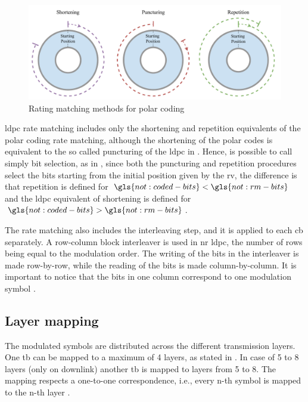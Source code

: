 \begin{figure}[htb]
    \includegraphics[width=\columnwidth]{figures/chp_theory/rate-matching.pdf}
    \caption{Rating matching methods for polar coding}
    \label{fig:rate-matching}
\end{figure}

\Gls{ldpc} rate matching includes only the shortening and repetition equivalents of the polar coding rate matching, although the shortening of the polar codes is equivalent to the so called puncturing of the \gls{ldpc} in \cite{Hui2018}.
%
Hence, is possible to call simply bit selection, as in \cite{3gpp.38.212}, since both the puncturing and repetition procedures select the bits starting from the initial position given by the \gls{rv}, the difference is that repetition is defined for $\gls{not:coded-bits} < \gls{not:rm-bits}$ and the \gls{ldpc} equivalent of shortening is defined for $\gls{not:coded-bits} > \gls{not:rm-bits}$.

The rate matching also includes the interleaving step, and it is applied to each \gls{cb} separately.
%
A row-column block interleaver is used in \gls{nr} \gls{ldpc}, the number of rows being equal to the modulation order.
%
The writing of the bits in the interleaver is made row-by-row, while the reading of the bits is made column-by-column.
%
It is important to notice that the bits in one column correspond to one modulation symbol \cite{Hamidi8417496,ErikDahlman5G}.

\subsection{Layer mapping}

The modulated symbols are distributed across the different transmission layers.
%
One \gls{tb} can be mapped to a maximum of 4 layers, as stated in  \cite[Table 7.3.1.3]{3gpp.38.211}.
%
In case of 5 to 8 layers (only on downlink) another \gls{tb} is mapped to layers from 5 to 8.
%
The mapping respects a one-to-one correspondence, i.e., every n-th symbol is mapped to the n-th layer \cite{ErikDahlman5G}.

